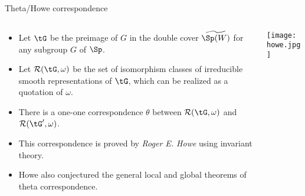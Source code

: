 \documentclass[final,hyperref={pdfpagelabels=false}]{beamer} %
\def\cR{{\mathcal{R}}}
\begin{document}
\begin{frame}
\begin{columns}[t]
\begin{column}{.48\linewidth}
    \begin{block}{Theta/Howe correspondence}
      \begin{columns}
        \begin{column}{0.7\textwidth}
      \begin{itemize}
        \item Let $\tG$ be the preimage of $G$ in the double cover 
          $\widetilde{\Sp(W)}$ for any subgroup $G$ of $\Sp$.
        \item Let $\cR(\tG,\omega)$ be the set of isomorphism classes 
          of irreducible smooth representations of $\tG$,
          which can be realized as a quotation of $\omega$.
        \item There is a one-one correspondence $\theta$
          between $\cR(\tG,\omega)$ and $\cR(\tG',\omega)$.
        \item This correspondence is proved by {\em Roger E. Howe} 
          using invariant theory.
        \item Howe also conjectured the general local and global theorems of theta correspondence.
      \end{itemize}
    \end{column}
    \begin{column}{0.26\textwidth}
      \texttt{[image: howe.jpg]}
    \end{column}
  \end{columns}
\end{block}


\end{column}
\end{columns}
\end{frame}
\end{document}
